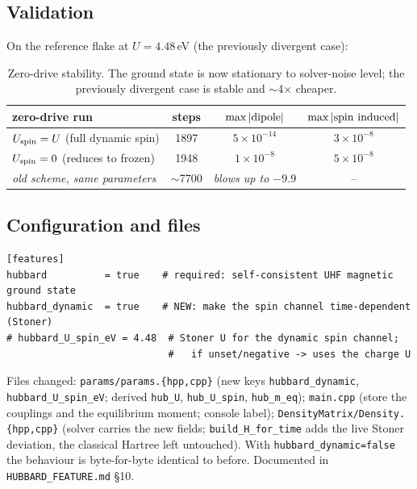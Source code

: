 \documentclass[11pt]{article}
\newcommand{\code}[1]{\texttt{\small #1}}
\begin{document}
\subsection{Validation}
On the reference flake at $U=4.48$\,eV (the previously divergent case):
\begin{table}[h]
\centering
\begin{tabular}{lccc}
\toprule
zero-drive run & steps & $\max|{\rm dipole}|$ & $\max|{\rm spin\ induced}|$\\
\midrule
$U_{\rm spin}=U$ (full dynamic spin) & 1897 & $5\times10^{-14}$ & $3\times10^{-8}$\\
$U_{\rm spin}=0$ (reduces to frozen) & 1948 & $1\times10^{-8}$ & $5\times10^{-8}$\\
\emph{old scheme, same parameters} & $\sim$7700 & \emph{blows up to $-9.9$} & --\\
\bottomrule
\end{tabular}
\caption{Zero-drive stability. The ground state is now stationary to
solver-noise level; the previously divergent case is stable and $\sim$4$\times$
cheaper.}
\end{table}

\subsection{Configuration and files}
\begin{lstlisting}
[features]
hubbard          = true    # required: self-consistent UHF magnetic ground state
hubbard_dynamic  = true    # NEW: make the spin channel time-dependent (Stoner)
# hubbard_U_spin_eV = 4.48  # Stoner U for the dynamic spin channel;
                            #   if unset/negative -> uses the charge U
\end{lstlisting}
Files changed: \code{params/params.\{hpp,cpp\}} (new keys \code{hubbard\_dynamic},
\code{hubbard\_U\_spin\_eV}; derived \code{hub\_U}, \code{hub\_U\_spin},
\code{hub\_m\_eq}); \code{main.cpp} (store the couplings and the equilibrium
moment; console label); \code{DensityMatrix/Density.\{hpp,cpp\}} (solver carries
the new fields; \code{build\_H\_for\_time} adds the live Stoner deviation, the
classical Hartree left untouched). With \code{hubbard\_dynamic=false} the
behaviour is byte-for-byte identical to before. Documented in
\code{HUBBARD\_FEATURE.md} \S10.

\end{document}
